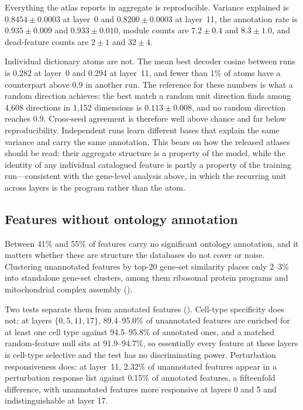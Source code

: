 \documentclass[onecolumn,11pt]{article}
\begin{document}
Everything the atlas reports in aggregate is reproducible. Variance explained is
$0.8454 \pm 0.0003$ at layer~0 and $0.8200 \pm 0.0003$ at layer~11, the annotation rate is
$0.935 \pm 0.009$ and $0.933 \pm 0.010$, module counts are $7.2 \pm 0.4$ and $8.3 \pm 1.0$, and
dead-feature counts are $2 \pm 1$ and $32 \pm 4$.

Individual dictionary atoms are not. The mean best decoder cosine between runs is 0.282 at layer~0
and 0.294 at layer~11, and fewer than 1\% of atoms have a counterpart above 0.9 in another run. The
reference for these numbers is what a random direction achieves: the best match a random unit
direction finds among 4,608 directions in 1,152 dimensions is $0.113 \pm 0.008$, and no random
direction reaches 0.9. Cross-seed agreement is therefore well above chance and far below
reproducibility. Independent runs learn different bases that explain the same variance and carry the
same annotation. This bears on how the released atlases should be read: their aggregate structure
is a property of the model, while the identity of any individual catalogued feature is partly a
property of the training run---consistent with the gene-level analysis above, in which the recurring
unit across layers is the program rather than the atom.

\subsection*{Features without ontology annotation}
\label{sec:unannotated}

Between 41\% and 55\% of features carry no significant ontology annotation, and it matters whether
these are structure the databases do not cover or noise. Clustering unannotated features by
top-20 gene-set similarity places only 2--3\% into standalone gene-set clusters, among them
ribosomal protein programs and mitochondrial complex assembly ().

Two tests separate them from annotated features (). Cell-type specificity
does not: at layers $\{0, 5, 11, 17\}$, 89.4--95.0\% of unannotated features are enriched for at
least one cell type against 94.5--95.8\% of annotated ones, and a matched random-feature null sits
at 91.9--94.7\%, so essentially every feature at these layers is cell-type selective and the test
has no discriminating power. Perturbation responsiveness does: at layer~11, 2.32\% of unannotated
features appear in a perturbation response list against 0.15\% of annotated features, a fifteenfold
difference, with unannotated features more responsive at layers 0 and 5 and indistinguishable at layer 17.
\end{document}
